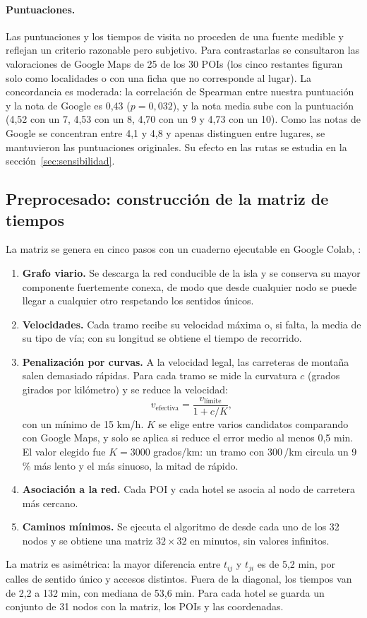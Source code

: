 \paragraph{Puntuaciones.} Las puntuaciones y los tiempos de visita no proceden de una fuente medible y reflejan un criterio razonable pero subjetivo. Para contrastarlas se consultaron las valoraciones de Google Maps de 25 de los 30 POIs (los cinco restantes figuran solo como localidades o con una ficha que no corresponde al lugar). La concordancia es moderada: la correlación de Spearman entre nuestra puntuación y la nota de Google es 0,43 ($p = 0{,}032$), y la nota media sube con la puntuación (4,52 con un 7, 4,53 con un 8, 4,70 con un 9 y 4,73 con un 10). Como las notas de Google se concentran entre 4,1 y 4,8 y apenas distinguen entre lugares, se mantuvieron las puntuaciones originales. Su efecto en las rutas se estudia en la sección~\ref{sec:sensibilidad}.

\subsection{Preprocesado: construcción de la matriz de tiempos}

La matriz se genera en cinco pasos con un cuaderno ejecutable en Google Colab, :
\begin{enumerate}
  \item \textbf{Grafo viario.} Se descarga la red conducible de la isla y se conserva su mayor componente fuertemente conexa, de modo que desde cualquier nodo se puede llegar a cualquier otro respetando los sentidos únicos.
  \item \textbf{Velocidades.} Cada tramo recibe su velocidad máxima o, si falta, la media de su tipo de vía; con su longitud se obtiene el tiempo de recorrido.
  \item \textbf{Penalización por curvas.} A la velocidad legal, las carreteras de montaña salen demasiado rápidas. Para cada tramo se mide la curvatura $c$ (grados girados por kilómetro) y se reduce la velocidad:
  \begin{equation}
    v_{\text{efectiva}} = \frac{v_{\text{límite}}}{1 + c/K},
  \end{equation}
  con un mínimo de 15 km/h. $K$ se elige entre varios candidatos comparando con Google Maps, y solo se aplica si reduce el error medio al menos 0,5 min. El valor elegido fue $K = 3000$ grados/km: un tramo con 300\,\textdegree/km circula un 9 \% más lento y el más sinuoso, la mitad de rápido.
  \item \textbf{Asociación a la red.} Cada POI y cada hotel se asocia al nodo de carretera más cercano.
  \item \textbf{Caminos mínimos.} Se ejecuta el algoritmo de \citet{dijkstra1959} desde cada uno de los 32 nodos y se obtiene una matriz $32 \times 32$ en minutos, sin valores infinitos.
\end{enumerate}
La matriz es asimétrica: la mayor diferencia entre $t_{ij}$ y $t_{ji}$ es de 5,2 min, por calles de sentido único y accesos distintos. Fuera de la diagonal, los tiempos van de 2,2 a 132 min, con mediana de 53,6 min. Para cada hotel se guarda un conjunto de 31 nodos con la matriz, los POIs y las coordenadas.

